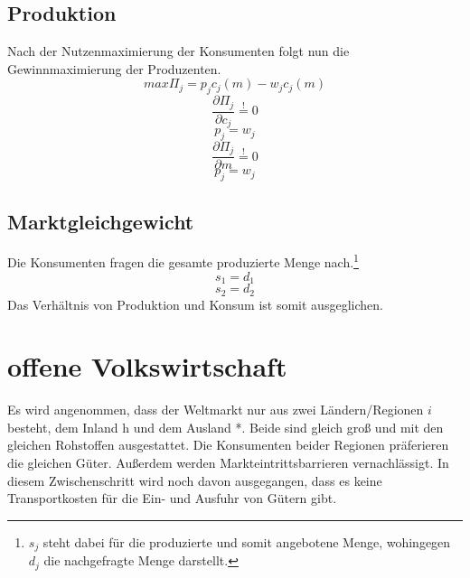 \subsection{Produktion} 
Nach der Nutzenmaximierung der Konsumenten folgt nun die Gewinnmaximierung der Produzenten. 
\begin{equation} max\Pi_j=p_jc_j(m)-w_jc_j(m)\end{equation}
\begin{equation}\frac{\partial \Pi_j}{\partial c_j}\overset{!}{=}0\end{equation}
\begin{equation}p_j=w_j\end{equation}
\begin{equation}\frac{\partial \Pi_j}{\partial m}\overset{!}{=}0\end{equation}
\begin{equation}p_j=w_j\end{equation}
\begin{center}
\begin{flushright}
\newline
\end{flushright}
\end{center}

\subsection{Marktgleichgewicht}
Die Konsumenten fragen die gesamte produzierte Menge nach.\footnote {$s_j$ steht dabei für die produzierte und somit angebotene Menge, wohingegen $d_j$ die nachgefragte Menge darstellt.}
\begin{equation} s_1=d_1\end{equation}
\begin{equation} s_2=d_2\end{equation}
Das Verh{\"a}ltnis von Produktion und Konsum ist somit ausgeglichen.

\section{offene Volkswirtschaft}
Es wird angenommen, dass der Weltmarkt nur aus zwei L{\"a}ndern/Regionen $i$ besteht, dem Inland {\dq}h{\dq} und dem Ausland {\dq}*{\dq}. Beide sind gleich gro{\ss} und mit den gleichen Rohstoffen ausgestattet. Die Konsumenten beider Regionen pr{\"a}ferieren die gleichen G{\"u}ter. Au{\ss}erdem werden Markteintrittsbarrieren vernachl{\"a}ssigt. In diesem Zwischenschritt wird noch davon ausgegangen, dass es keine Transportkosten f{\"u}r die Ein- und Ausfuhr von G{\"u}tern gibt.

